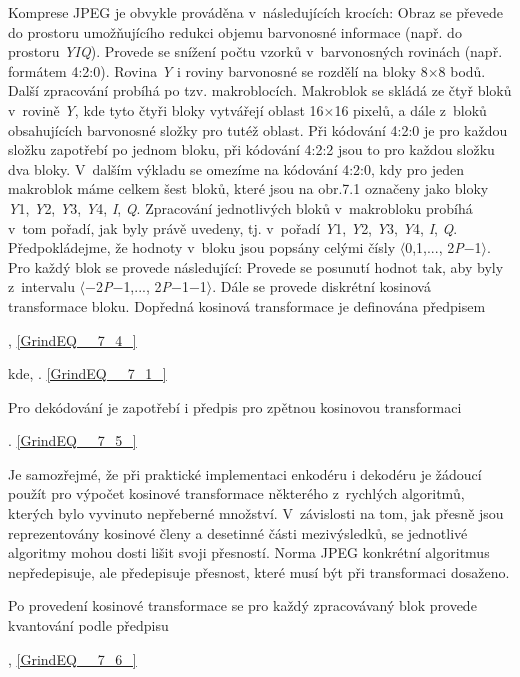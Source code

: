 \noindent Komprese JPEG je obvykle prováděna v~následujících krocích: Obraz se převede do prostoru umožňujícího redukci objemu barvonosné informace (např. do prostoru \textit{YIQ}). Provede se snížení počtu vzorků v~barvonosných rovinách (např. formátem 4:2:0). Rovina \textit{Y} i roviny barvonosné se rozdělí na bloky 8$\times$8 bodů. Další zpracování probíhá po tzv. makroblocích. Makroblok se skládá ze čtyř bloků v~rovině \textit{Y}, kde tyto čtyři bloky vytvářejí oblast 16$\times$16 pixelů, a dále z~bloků obsahujících barvonosné složky pro tutéž oblast. Při kódování 4:2:0 je pro každou složku zapotřebí po jednom bloku, při kódování 4:2:2 jsou to pro každou složku dva bloky. V~dalším výkladu se omezíme na kódování 4:2:0, kdy pro jeden makroblok máme celkem šest bloků, které jsou na obr.7.1 označeny jako bloky \textit{Y}1, \textit{Y}2, \textit{Y}3, \textit{Y}4,\textit{ I}, \textit{Q}. Zpracování jednotlivých bloků v~makrobloku probíhá v~tom pořadí, jak byly právě uvedeny, tj. v~pořadí \textit{Y}1, \textit{Y}2, \textit{Y}3, \textit{Y}4, \textit{I}, \textit{Q}. Předpokládejme, že hodnoty v~bloku jsou popsány celými čísly $\langle$0,1,...,  2\textit{P}$-$1$\rangle$. Pro každý blok se provede následující: Provede se posunutí hodnot tak, aby byly z~intervalu $\langle$$-$2\textit{P}$-$1,..., 2\textit{P}$-$1$-$1$\rangle$. Dále se provede diskrétní kosinová transformace bloku. Dopředná kosinová transformace je definována předpisem

 , \eqref{GrindEQ__7_4_}

\noindent kde, . \eqref{GrindEQ__7_1_}

\noindent Pro dekódování je zapotřebí i předpis pro zpětnou kosinovou transformaci

 . \eqref{GrindEQ__7_5_}

\noindent Je samozřejmé, že při praktické implementaci enkodéru i dekodéru je žádoucí použít pro výpočet kosinové transformace některého z~rychlých algoritmů, kterých bylo vyvinuto nepřeberné množství. V~závislosti na tom, jak přesně jsou reprezentovány kosinové členy a desetinné části mezivýsledků, se jednotlivé algoritmy mohou dosti lišit svoji přesností. Norma JPEG konkrétní algoritmus nepředepisuje, ale předepisuje přesnost, které musí být při transformaci dosaženo.

\noindent 

\noindent Po provedení kosinové transformace se pro každý zpracovávaný blok provede kvantování podle předpisu

 , \eqref{GrindEQ__7_6_}

